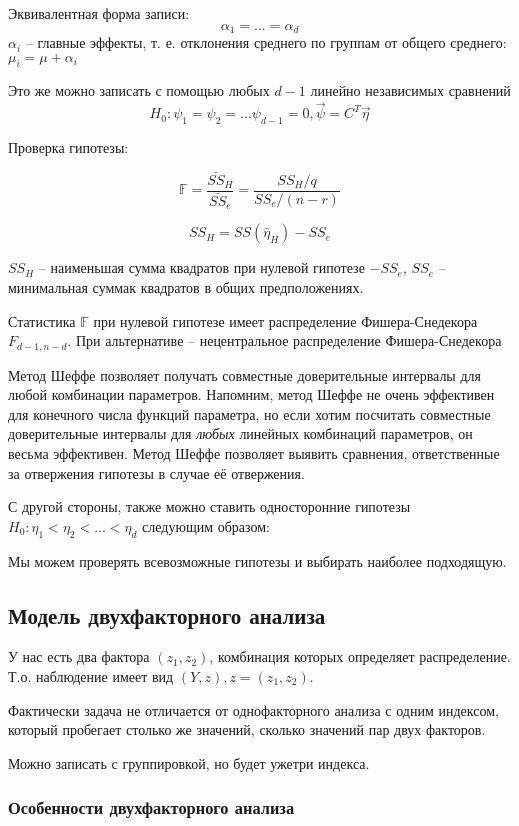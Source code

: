 \documentclass[main.tex]{subfiles}
\begin{document}
Эквивалентная форма записи:
\[ \alpha_1 = ... = \alpha_d \]
$ \alpha_i $ --  главные эффекты, т. е. отклонения среднего по группам от общего среднего: $ \mu_i = \mu + \alpha_i $

Это же можно записать с помощью любых $ d-1 $ линейно независимых сравнений
\[ H_0 : \psi_1 = \psi_2 = ... \psi_{d-1} = 0, \vec \psi = C^T  \vec \eta \]

Проверка гипотезы:

\[ \mathds F = \frac{\bar{SS}_H}{\bar{SS}_e} = \frac{SS_H /q}{SS_e /(n-r)} \]

\[ SS_H = SS(\hat \eta_H) - SS_e \]

$ SS_H $ -- наименьшая сумма квадратов при нулевой гипотезе $ - SS_e $, $ SS_e $ -- минимальная суммак квадратов в общих предположениях.

Статистика $ \mathds F $ при нулевой гипотезе имеет распределение Фишера-Снедекора $F_{d-1,n-d}$.
При альтернативе -- нецентральное распределение Фишера-Снедекора %

Метод Шеффе позволяет получать совместные доверительные интервалы для любой комбинации параметров.
Напомним, метод Шеффе не очень эффективен для конечного числа функций параметра, но если хотим посчитать совместные доверительные интервалы для \emph{любых} линейных комбинаций параметров, он весьма эффективен.
Метод Шеффе позволяет выявить сравнения, ответственные за отвержения гипотезы в случае её отвержения.

С другой стороны, также можно ставить односторонние гипотезы $ H_0 : \eta_1 < \eta_2 < ... < \eta_d $ следующим образом: %

Мы можем проверять всевозможные гипотезы и выбирать наиболее подходящую.

\subsection{Модель двухфакторного анализа}

У нас есть два фактора $ (z_1, z_2) $, комбинация которых определяет распределение.
Т.о. наблюдение имеет вид $ (Y,z), z = (z_1, z_2) $.

Фактически задача не отличается от однофакторного анализа с одним индексом, который пробегает столько же значений, сколько значений пар двух факторов.

Можно записать с группировкой, но будет ужетри индекса.

\subsubsection{Особенности двухфакторного анализа}
\end{document}
